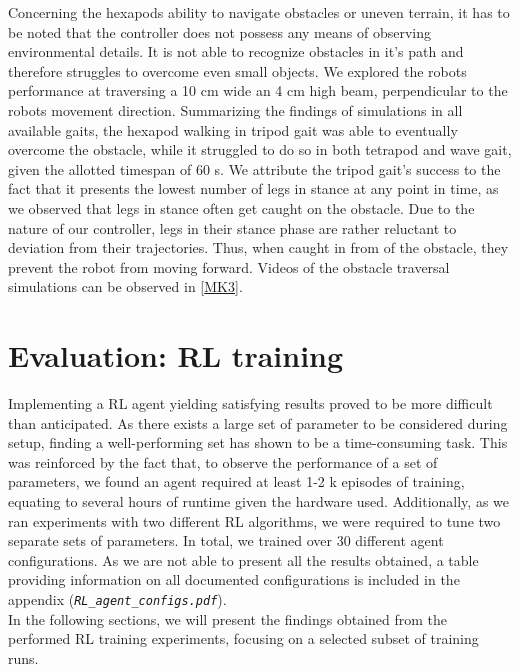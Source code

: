 Concerning the hexapods ability to navigate obstacles or uneven terrain, it has to be noted that the controller does not possess any means of observing environmental details.
It is not able to recognize obstacles in it's path and therefore struggles to overcome even small objects.
We explored the robots performance at traversing a 10 cm wide an 4 cm high beam, perpendicular to the robots movement direction.
Summarizing the findings of simulations in all available gaits, the hexapod walking in tripod gait was able to eventually overcome the obstacle, while it struggled to do so in both tetrapod and wave gait, given the allotted timespan of 60 s.
We attribute the tripod gait's success to the fact that it presents the lowest number of legs in stance at any point in time, as we observed that legs in stance often get caught on the obstacle.
Due to the nature of our controller, legs in their stance phase are rather reluctant to deviation from their trajectories.
Thus, when caught in from of the obstacle, they prevent the robot from moving forward.
Videos of the obstacle traversal simulations can be observed in [\hyperref[vid: MK1]{MK3}].


\section{Evaluation: RL training}

Implementing a RL agent yielding satisfying results proved to be more difficult than anticipated.
As there exists a large set of parameter to be considered during setup, finding a well-performing set has shown to be a time-consuming task.
This was reinforced by the fact that, to observe the performance of a set of parameters, we found an agent required at least 1-2 k episodes of training, equating to several hours of runtime given the hardware used.
Additionally, as we ran experiments with two different RL algorithms, we were required to tune two separate sets of parameters.
In total, we trained over 30 different agent configurations.
As we are not able to present all the results obtained, a table providing information on all documented configurations is included in the appendix (\emph{\nolinkurl{RL_agent_configs.pdf}}).\\
In the following sections, we will present the findings obtained from the performed RL training experiments, focusing on a selected subset of training runs.


